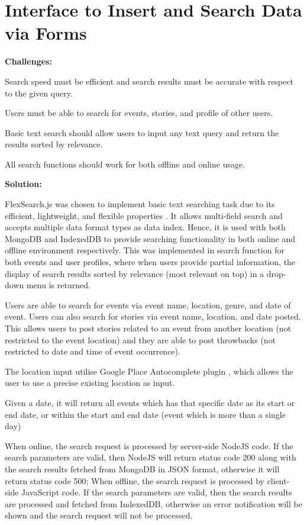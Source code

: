 \documentclass[11pt, a4paper]{article}
\begin{document}
\section{Interface to Insert and Search Data via Forms}
\textbf{Challenges:}
\begin{enumerate*}[label=\textbf{\arabic*})]
\item Search speed must be efficient and search results must be accurate with respect to the given
query.
\item Users must be able to search for events, stories, and profile of other users.
\item Basic text search should allow users to input any text query and return the results sorted by
relevance.
\item All search functions should work for both offline and online usage.
\end{enumerate*}
%
\textbf{Solution:}
\begin{enumerate*}[label=\textbf{\arabic*})]
\item FlexSearch.js \cite{flexsearch} was chosen to implement basic text searching task due to its
efficient, lightweight, and flexible properties \cite{flexsearch_benchmark}. It allows multi-field
search and accepts multiple data format types as data index. Hence, it is used with both MongoDB and
IndexedDB to provide searching functionality in both online and offline environment respectively.
This was implemented in search function for both events and user profiles, where when users provide
partial information, the display of search results sorted by relevance (most relevant on top) in a
drop-down menu is returned.
\item Users are able to search for events via event name, location, genre, and date of event. Users
can also search for stories via event name, location, and date posted. This allows users to post
stories related to an event from another location (not restricted to the event location) and they
are able to post throwbacks (not restricted to date and time of event occurrence).
\item The location input utilise Google Place Autocomplete plugin \cite{google_maps_api}, which
allows the user to use a precise existing location as input.
\item Given a date, it will return all events which has that specific date as its start or end date,
or within the start and end date (event which is more than a single day)
\item When online, the search request is processed by server-side NodeJS code. If the search
parameters are valid, then NodeJS will return status code 200 along with the search results fetched
from MongoDB in JSON format, otherwise it will return status code 500; When offline, the search
request is processed by client-side JavaScript code. If the search parameters are valid, then the
search results are processed and fetched from IndexedDB, otherwise an error notification will be
shown and the search request will not be processed.
\end{enumerate*}
\end{document}
